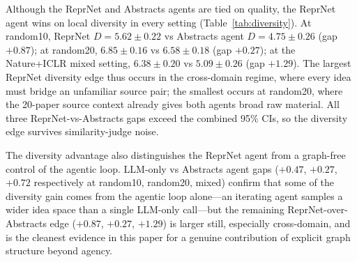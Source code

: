 \documentclass[10pt,twocolumn]{article}
\begin{document}
Although the ReprNet and Abstracts agents are tied on quality, the ReprNet agent wins
on local diversity in every setting (Table~\ref{tab:diversity}).  At
random10, ReprNet $D = 5.62 \pm 0.22$ vs Abstracts agent $D = 4.75 \pm 0.26$
(gap $+0.87$); at random20, $6.85 \pm 0.16$ vs $6.58 \pm 0.18$ (gap
$+0.27$); at the Nature+ICLR mixed setting, $6.38 \pm 0.20$ vs
$5.09 \pm 0.26$ (gap $+1.29$).  The largest ReprNet diversity edge thus
occurs in the cross-domain regime, where every idea must bridge an
unfamiliar source pair; the smallest occurs at random20, where the
20-paper source context already gives both agents broad raw material.
All three ReprNet-vs-Abstracts gaps exceed the combined 95\% CIs, so the
diversity edge survives similarity-judge noise.

The diversity advantage also distinguishes the ReprNet agent from a graph-free
control of the agentic loop.  LLM-only vs Abstracts agent gaps ($+0.47$,
$+0.27$, $+0.72$ respectively at random10, random20, mixed) confirm
that some of the diversity gain comes from the agentic loop alone---an
iterating agent samples a wider idea space than a single LLM-only call---but
the remaining ReprNet-over-Abstracts edge ($+0.87$, $+0.27$, $+1.29$) is
larger still, especially cross-domain, and is the cleanest evidence in
this paper for a genuine contribution of explicit graph structure
beyond agency.
\end{document}
